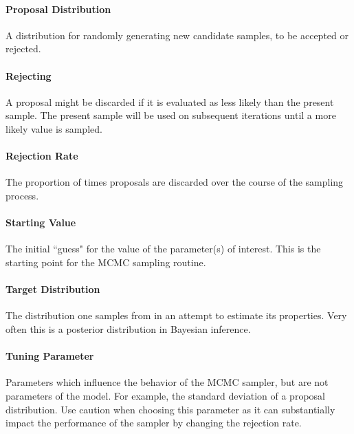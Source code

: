 	\paragraph{Proposal Distribution} A distribution for randomly generating new candidate samples, to be accepted or rejected.
	\paragraph{Rejecting} A proposal might be discarded if it is evaluated as less likely than the present sample. The present sample will be used on subsequent iterations until a more likely value is sampled.
	\paragraph{Rejection Rate} The proportion of times proposals are discarded over the course of the sampling process.
	\paragraph{Starting Value} The initial ``guess" for the value of the parameter(s) of interest. This is the starting point for the MCMC sampling routine.
	\paragraph{Target Distribution} The distribution one samples from in an attempt to estimate its properties. Very often this is a posterior distribution in Bayesian inference.
	\paragraph{Tuning Parameter} Parameters which influence the behavior of the MCMC sampler, but are not parameters of the model. For example, the standard deviation of a proposal distribution. Use caution when choosing this parameter as it can substantially impact the performance of the sampler by changing the rejection rate.

